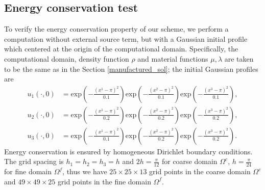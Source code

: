\subsection{Energy conservation test}\label{conserved_energy}
To verify the energy conservation property of our scheme, we perform a computation without external source term, but with a Gaussian initial profile which centered at the origin of the computational domain.  Specifically, the computational domain, density function $\rho$ and material functions $\mu, \lambda$ are taken to be the same as in the Section \ref{manufactured_sol}; the initial Gaussian profiles are
\begin{align*}
	u_1(\cdot,0) &= \mbox{exp}\left(-\frac{(x^1-\pi)^2}{0.1}\right)\mbox{exp}\left(-\frac{(x^2-\pi)^2}{0.1}\right)\mbox{exp}\left(-\frac{(x^3-\pi)^2}{0.1}\right),\\
	u_2(\cdot,0) &= \mbox{exp}\left(-\frac{(x^1-\pi)^2}{0.2}\right)\mbox{exp}\left(-\frac{(x^2-\pi)^2}{0.2}\right)\mbox{exp}\left(-\frac{(x^3-\pi)^2}{0.2}\right),\\
	u_3(\cdot,0) &= \mbox{exp}\left(-\frac{(x^1-\pi)^2}{0.1}\right)\mbox{exp}\left(-\frac{(x^2-\pi)^2}{0.2}\right)\mbox{exp}\left(-\frac{(x^3-\pi)^2}{0.2}\right).
\end{align*}
Energy conservation is ensured by homogeneous Dirichlet boundary conditions. The grid spacing is $h_1 = h_2 = h_3 = h$ and $2h = \frac{\pi}{12}$ for coarse domain $\Omega^c$, $h = \frac{\pi}{24}$ for fine domain $\Omega^f$, thus we have $25\times25\times13$ grid points in the coarse domain $\Omega^c$ and $49\times49\times25$ grid points in the fine domain $\Omega^f$. 

